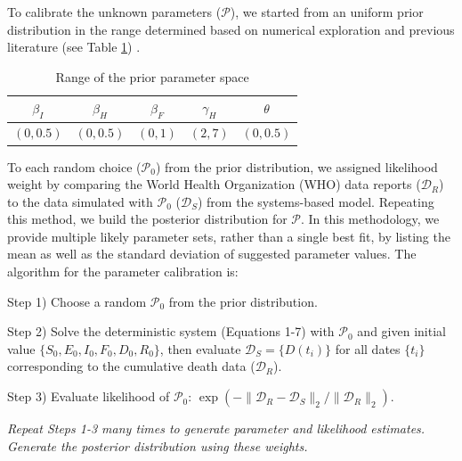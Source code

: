 To calibrate the unknown parameters ($\mathcal{P}$), we started from an uniform prior distribution in the range determined based on numerical exploration and previous literature (see Table \ref{tab:PriorRanges}) \cite{Rivers2014}. \\

\begin{table}[ht]
\centering %
\begin{tabular}{c c c c c}
\hline\hline %
$\beta_{I}$ & $\beta_{H}$ & $\beta_{F}$ & $\gamma_{H}$ & $\theta$ \\ [0.5ex]
\hline %
$(0,0.5)$ & $(0,0.5)$ & $(0,1)$ & $(2,7)$ & $(0,0.5)$ \\ [0.5ex]
\hline
\end{tabular}
\caption{Range of the prior parameter space} %
\label{tab:PriorRanges}
\end{table}


To each random choice ($\mathcal{P}_0$) from the prior distribution, we assigned likelihood weight by comparing the World Health Organization (WHO) data reports ($\mathcal{D}_R$) to the data simulated with $\mathcal{P}_0$ ($\mathcal{D}_S$) from the systems-based model. Repeating this method, we build the posterior distribution for $\mathcal{P}$. In this methodology, we provide multiple likely parameter sets, rather than a single best fit, by listing the mean as well as the standard deviation of suggested parameter values. The algorithm for the parameter calibration is:

Step 1) Choose a random $\mathcal{P}_0$ from the prior distribution.

Step 2) Solve the deterministic system (Equations 1-7) with $\mathcal{P}_0$ and given initial value $\{S_0,E_0,I_0,F_0,D_0,R_0\}$, then evaluate $\mathcal{D}_S=\{D(t_i)\}$ for all dates $\{t_i\}$ corresponding to the cumulative death data ($\mathcal{D}_R$).

Step 3) Evaluate likelihood of $\mathcal{P}_0$: $\exp\left(-\lVert\mathcal{D}_R-\mathcal{D}_S\rVert_2/\lVert\mathcal{D}_R\rVert_2\right)$.

\emph{Repeat Steps 1-3 many times to generate {parameter and likelihood} estimates. Generate the posterior distribution using these weights.}

